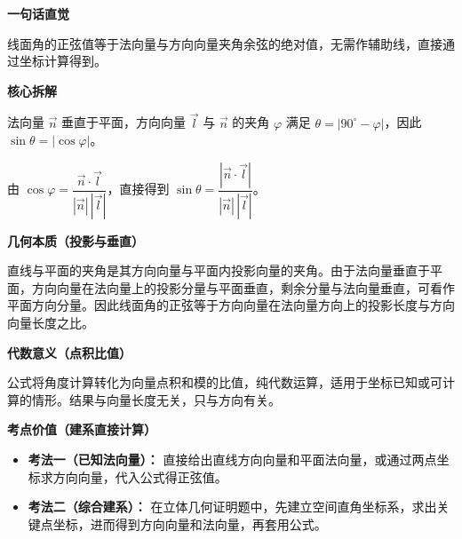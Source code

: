 \begin{explanationbox}

	\textbf{\textcolor{CExplanation}{一句话直觉}}

	线面角的正弦值等于法向量与方向向量夹角余弦的绝对值，无需作辅助线，直接通过坐标计算得到。

	\medskip

	\textbf{\textcolor{CExplanation}{核心拆解}}

	\begin{description}[style=nextline, leftmargin=2.8em, labelsep=0.5em, itemsep=0.45em]
		\item[\textbf{要点一（几何关系）：}]
		      法向量 $\vec{n}$ 垂直于平面，方向向量 $\vec{l}$ 与 $\vec{n}$ 的夹角 $\varphi$ 满足 $\theta = |90^\circ - \varphi|$，因此 $\sin\theta = |\cos\varphi|$。

		\item[\textbf{要点二（代数转化）：}]
		      由 $\cos\varphi = \dfrac{\vec{n}\cdot\vec{l}}{|\vec{n}|\,|\vec{l}|}$，直接得到 $\sin\theta = \dfrac{|\vec{n}\cdot\vec{l}|}{|\vec{n}|\,|\vec{l}|}$。
	\end{description}

	\medskip

	\textbf{\textcolor{CExplanation}{几何本质（投影与垂直）}}

	直线与平面的夹角是其方向向量与平面内投影向量的夹角。由于法向量垂直于平面，方向向量在法向量上的投影分量与平面垂直，剩余分量与法向量垂直，可看作平面方向分量。因此线面角的正弦等于方向向量在法向量方向上的投影长度与方向向量长度之比。

	\medskip

	\textbf{\textcolor{CExplanation}{代数意义（点积比值）}}

	公式将角度计算转化为向量点积和模的比值，纯代数运算，适用于坐标已知或可计算的情形。结果与向量长度无关，只与方向有关。

	\medskip

	\textbf{\textcolor{CExplanation}{考点价值（建系直接计算）}}

	\begin{itemize}[leftmargin=*, itemsep=0.5em, topsep=0.4em]
		\item \textbf{考法一（已知法向量）：} 直接给出直线方向向量和平面法向量，或通过两点坐标求方向向量，代入公式得正弦值。
		\item \textbf{考法二（综合建系）：} 在立体几何证明题中，先建立空间直角坐标系，求出关键点坐标，进而得到方向向量和法向量，再套用公式。
	\end{itemize}


\end{explanationbox}
